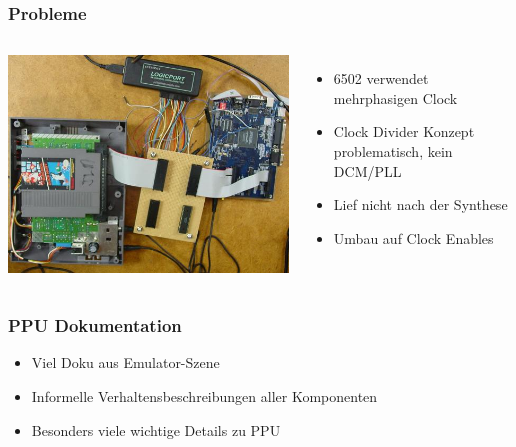 \documentclass{beamer}
\begin{document}
    \begin{frame}
        \frametitle{Probleme}        
        \begin{columns}
                \includegraphics[width=1.1\textwidth]{img/danleach.jpg}
                \begin{itemize}
                    \item{6502 verwendet mehrphasigen Clock}
                    \item{Clock Divider Konzept problematisch, kein DCM/PLL}
                    \item{Lief nicht nach der Synthese}
                    \item{Umbau auf Clock Enables}
                \end{itemize}
        \end{columns}
    \end{frame}
    
    
    \begin{frame}
        \frametitle{PPU Dokumentation}
        \begin{itemize}
            \item{Viel Doku aus Emulator-Szene}
            \item{Informelle Verhaltensbeschreibungen aller Komponenten}
            \item{Besonders viele wichtige Details zu PPU}
        \end{itemize}
    \end{frame}
    
\end{document}
